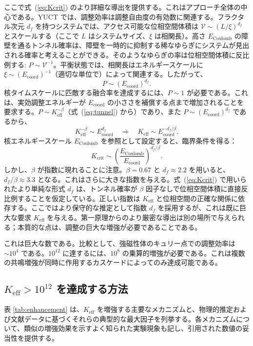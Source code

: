 \documentclass[12pt]{article}
\newcommand{\Keff}{K_{\mathrm{eff}}}
\newcommand{\df}{d_{\!f}}
\newcommand{\Kcrit}{K_{\mathrm{crit}}}
\theoremstyle{remark}
\begin{document}
	ここで式~(\ref{eq:Kcrit}) のより詳細な導出を提供する。これはアプローチ全体の中心である。YUCT では、調整効率は調整自由度の有効数に関連する。フラクタル次元 \(\df\) を持つシステムでは、アクセス可能な位相空間体積は \(\mathcal{V} \sim (L/\xi)^{\df}\) とスケールする（ここで \(L\) はシステムサイズ、\(\xi\) は相関長）。高さ \(E_{\text{Coulomb}}\) の障壁を通るトンネル確率は、障壁を一時的に抑制する稀なゆらぎにシステムが見出される確率と考えることができる。そのようなゆらぎの率は位相空間体積に反比例する: \(P \sim \mathcal{V}^{-1}\)。平衡状態では、相関長はエネルギースケールに \(\xi \sim (E_{\mathrm{coord}})^{-1}\)（適切な単位で）によって関連する。したがって、
	\[
	P \sim (E_{\mathrm{coord}})^{\df}.
	\]
	核タイムスケールに匹敵する融合率を達成するには、\(P \sim 1\) が必要である。これは、実効調整エネルギーが \(E_{\mathrm{coord}}\) の小ささを補償する点まで増加されることを要求する。\(P \sim \Keff^{-\beta}\)（式~(\ref{eq:tunnel}) から）であり、また \(P \sim (E_{\mathrm{coord}})^{\df}\) であるから、
	\[
	\Keff^{-\beta} \sim E_{\mathrm{coord}}^{\df} \quad\Longrightarrow\quad \Keff \sim E_{\mathrm{coord}}^{-\df/\beta}.
	\]
	核エネルギースケール \(E_{\text{Coulomb}}\) を参照として設定すると、臨界条件を得る：
	\[
	\Kcrit \sim \left( \frac{E_{\text{Coulomb}}}{E_{\mathrm{coord}}} \right)^{\df/\beta}.
	\]
	しかし、\(\beta\) が指数に現れることに注意。\(\beta = 0.67\) と \(\df \approx 2.2\) を用いると、\(\df/\beta \approx 3.3\) となる。これはさらに大きな指数を与える。式~(\ref{eq:Kcrit}) で用いられたより単純な形式 \(\df\) は、トンネル確率が \(\beta\) 因子なしで位相空間体積に直接反比例することを仮定している。正しい指数は \(\Keff\) と位相空間の正確な関係に依存する。ここではより保守的な推定として指数 \(\df\) を採用するが、これは既に巨大な要求 \(\Keff\) を与える。第一原理からのより厳密な導出は別の場所で与えられる；本質的な点は、調整の巨大な増強が必要であることである。
	
	これは巨大な数である。比較として、強磁性体のキュリー点での調整効率は \(\sim 10^4\) である。\(10^{12}\) に達するには、\(10^8\) の乗算的増強が必要である。これは複数の共鳴増強が同時に作用するカスケードによってのみ達成可能である。
	
	\subsection{\(\Keff > 10^{12}\) を達成する方法}
	
	表 \ref{tab:enhancement} は、\(\Keff\) を増強する主要なメカニズムと、物理的推定および文献データに基づくそれらの典型的な最大因子を列挙する。各メカニズムについて、類似の増強効果を示すよく知られた実験現象も記し、引用された数値の妥当性を提供する。
	
\end{document}
